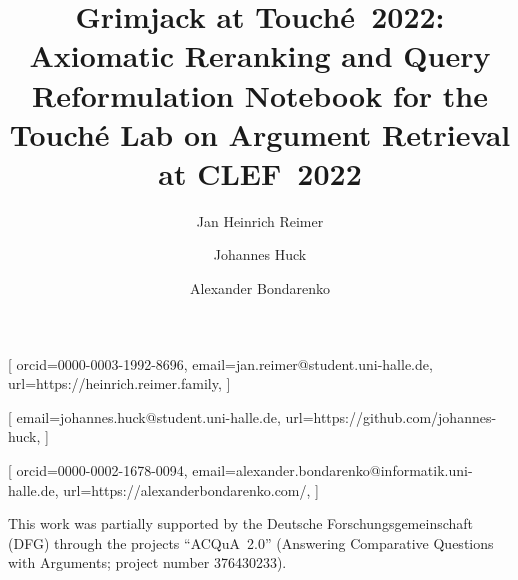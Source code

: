 \documentclass{ceurart}
\begin{document}

\title{%
  Grimjack at \texorpdfstring{Touché~2022}{Touché 2022}:\texorpdfstring{\\}{ }
  Axiomatic Reranking and Query Reformulation%
}
\title[mode=sub]{%
  Notebook for the Touché Lab on Argument Retrieval at CLEF\ 2022%
}

\author{Jan Heinrich Reimer}[
  orcid=0000-0003-1992-8696,
  email=jan.reimer@student.uni-halle.de,
  url=https://heinrich.reimer.family,
]
\author{Johannes Huck}[
  email=johannes.huck@student.uni-halle.de,
  url=https://github.com/johannes-huck,
]
\author{Alexander Bondarenko}[
  orcid=0000-0002-1678-0094,
  email=alexander.bondarenko@informatik.uni-halle.de,
  url=https://alexanderbondarenko.com/,
]

\address{%
  Martin-Luther-Universität Halle-Wittenberg,
  06099~Halle~(Saale), Germany
}



\maketitle








\begin{acknowledgments}
This work was partially supported by the Deutsche Forschungsgemeinschaft (DFG) through the projects ``ACQuA~2.0'' (Answering Comparative Questions with Arguments; project number 376430233).
\end{acknowledgments}


\end{document}

